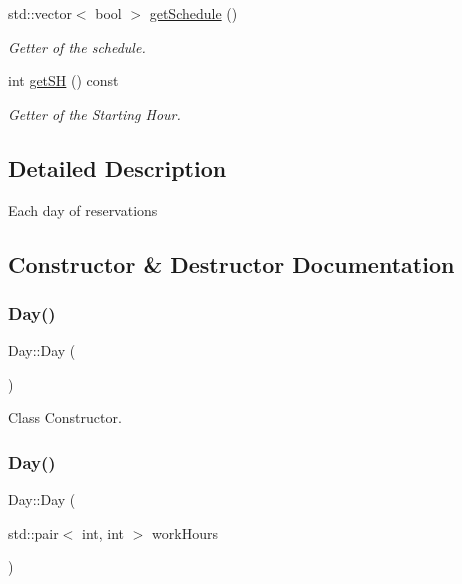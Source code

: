 \begin{DoxyCompactItemize}
std\+::vector$<$ bool $>$ \mbox{\hyperlink{class_day_a89096a2d290b712108feb7fe3bf7da51}{get\+Schedule}} ()
\begin{DoxyCompactList}\small\item\em Getter of the schedule. \end{DoxyCompactList}\item 
int \mbox{\hyperlink{class_day_ab730d15c19486aa3c45839e8f5990c57}{get\+SH}} () const
\begin{DoxyCompactList}\small\item\em Getter of the Starting Hour. \end{DoxyCompactList}\end{DoxyCompactItemize}


\subsection{Detailed Description}
Each day of reservations 

\subsection{Constructor \& Destructor Documentation}
\mbox{\label{class_day_a0d38b5839dd80b179cb8f0669283b3aa}} 
\subsubsection{\texorpdfstring{Day()}{Day()}\hspace{0.1cm}{\footnotesize\ttfamily [1/2]}}
{\footnotesize\ttfamily Day\+::\+Day (\begin{DoxyParamCaption}{ }\end{DoxyParamCaption})\hspace{0.3cm}{\ttfamily [inline]}}



Class Constructor. 

\mbox{\label{class_day_a0ba7af88eca9b5e6ca197c3d40b3ca66}} 
\subsubsection{\texorpdfstring{Day()}{Day()}\hspace{0.1cm}{\footnotesize\ttfamily [2/2]}}
{\footnotesize\ttfamily Day\+::\+Day (\begin{DoxyParamCaption}\item[{std\+::pair$<$ int, int $>$}]{work\+Hours }\end{DoxyParamCaption})}



